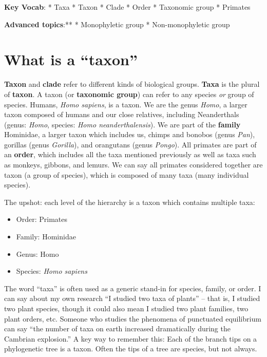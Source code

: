 \documentclass[
]{book}
\providecommand{\tightlist}{%
  \setlength{\itemsep}{0pt}\setlength{\parskip}{0pt}}
\begin{document}
\textbf{Key Vocab}:
* Taxa
* Taxon
* Clade
* Order
* Taxonomic group
* Primates

\textbf{Advanced topics}:**
* Monophyletic group
* Non-monophyletic group

\hypertarget{what-is-a-taxon}{%
\section{What is a ``taxon''}\label{what-is-a-taxon}}

\textbf{Taxon} and \textbf{clade} refer to different kinds of biological groups. \textbf{Taxa} is the plural of \textbf{taxon}. A taxon (or \textbf{taxonomic group}) can refer to any species \emph{or} group of species. Humans, \emph{Homo sapiens}, is a taxon. We are the genus \emph{Homo}, a larger taxon composed of humans and our close relatives, including Neanderthals (genus: \emph{Homo}, species: \emph{Homo neanderthalensis}). We are part of the \textbf{family} Hominidae, a larger taxon which includes us, chimps and bonobos (genus \emph{Pan}), gorillas (genus \emph{Gorilla}), and orangutans (genus \emph{Pongo}). All primates are part of an \textbf{order}, which includes all the taxa mentioned previously as well as taxa such as monkeys, gibbons, and lemurs. We can say all primates considered together are taxon (a group of species), which is composed of many taxa (many individual species).

The upshot: each level of the hierarchy is a taxon which contains multiple taxa:

\begin{itemize}
\tightlist
\item
  Order: Primates
\item
  Family: Hominidae
\item
  Genus: Homo
\item
  Species: \emph{Homo sapiens}
\end{itemize}

The word ``taxa'' is often used as a generic stand-in for species, family, or order. I can say about my own research ``I studied two taxa of plants'' -- that is, I studied two plant species, though it could also mean I studied two plant families, two plant orders, etc. Someone who studies the phenomena of punctuated equilibrium can say ``the number of taxa on earth increased dramatically during the Cambrian explosion.'' A key way to remember this: Each of the branch tips on a phylogenetic tree is a taxon. Often the tips of a tree are species, but not always.
\end{document}
